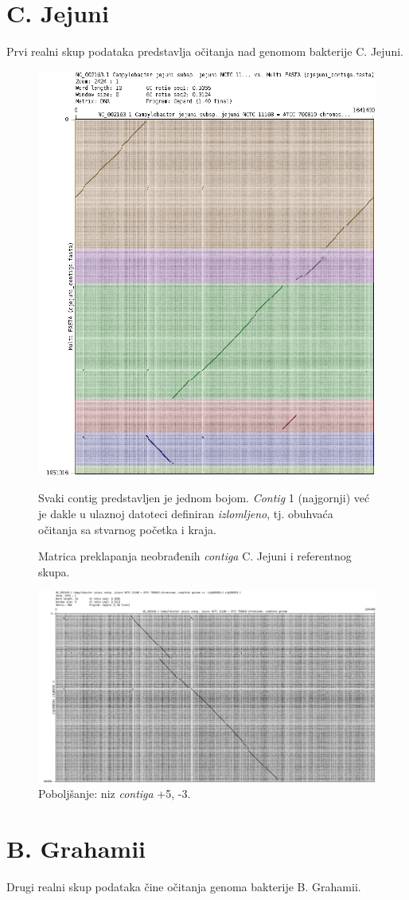\documentclass[times, utf8, seminar, numeric]{fer}
\begin{document}
\section{C. Jejuni}
Prvi realni skup podataka predstavlja očitanja nad genomom bakterije C. Jejuni.

\begin{figure}[h]
	\centering
	\centerline{\includegraphics[width=0.6\linewidth]{img/cj_contigs}}
	\caption{Matrica preklapanja neobrađenih \textit{contiga} C. Jejuni i referentnog skupa.}
	\label{fig:cjcontigs}
	\small
	Svaki contig predstavljen je jednom bojom. \textit{Contig} 1 (najgornji) već je dakle u ulaznoj datoteci definiran \textit{izlomljeno}, tj. obuhvaća očitanja sa stvarnog početka i kraja.
\end{figure}

\begin{figure}[h]
	\centering
	\centerline{\includegraphics[width=0.6\linewidth]{img/cj_5_3}}
	\caption{Poboljšanje: niz \textit{contiga} +5, -3.}
	\label{fig:cj53}
\end{figure}

\section{B. Grahamii}
Drugi realni skup podataka čine očitanja genoma bakterije B. Grahamii.
\end{document}
